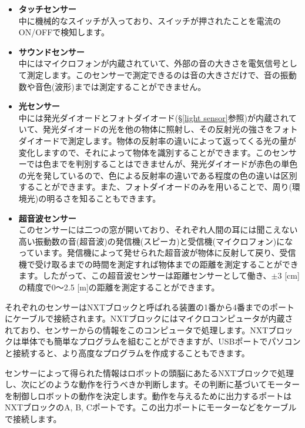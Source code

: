 \begin{itemize}
\item {\bf タッチセンサー}\\
中に機械的なスイッチが入っており、スイッチが押されたことを電流のON/OFFで検知します。

\item {\bf サウンドセンサー}\\
中にはマイクロフォンが内蔵されていて、外部の音の大きさを電気信号として測定します。このセンサーで測定できるのは音の大きさだけで、音の振動数や音色(波形)までは測定することができません。

\item {\bf 光センサー}\\
中には発光ダイオードとフォトダイオード(\S\ref{light sensor}参照)が内蔵されていて、発光ダイオードの光を他の物体に照射し、その反射光の強さをフォトダイオードで測定します。物体の反射率の違いによって返ってくる光の量が変化しますので、それによって物体を識別することができます。このセンサーでは色までを判別することはできませんが、発光ダイオードが赤色の単色の光を発しているので、色による反射率の違いである程度の色の違いは区別することができます。また、フォトダイオードのみを用いることで、周り(環境光)の明るさを知ることもできます。

\item {\bf 超音波センサー}\\
このセンサーには二つの窓が開いており、それぞれ人間の耳には聞こえない高い振動数の音(超音波)の発信機(スピーカ)と受信機(マイクロフォン)になっています。発信機によって発せられた超音波が物体に反射して戻り、受信機で受け取るまでの時間を測定すれば物体までの距離を測定することができます。したがって、この超音波センサーは距離センサーとして働き、$\pm 3$ [cm]の精度で0〜2.5 [m]の距離を測定することができます。


\end{itemize}

それぞれのセンサーはNXTブロックと呼ばれる装置の1番から4番までのポートにケーブルで接続されます。NXTブロックにはマイクロコンピュータが内蔵されており、センサーからの情報をこのコンピュータで処理します。NXTブロックは単体でも簡単なプログラムを組むことができますが、USBポートでパソコンと接続すると、より高度なプログラムを作成することもできます。

センサーによって得られた情報はロボットの頭脳にあたるNXTブロックで処理し、次にどのような動作を行うべきか判断します。その判断に基づいてモーターを制御しロボットの動作を決定します。動作を与えるために出力するポートはNXTブロックのA, B, Cポートです。この出力ポートにモーターなどをケーブルで接続します。

